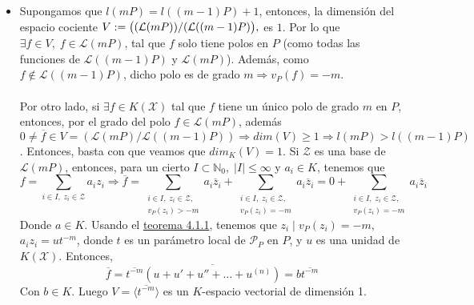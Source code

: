 \documentclass[11pt,spanish]{book}
\newcommand{\X}{\mathbf{\mathcal{X}}}
\begin{document}
\begin{itemize}
    \item Supongamos que $l(mP)=l((m-1)P)+1$, entonces, la dimensión del espacio cociente $V:=\big{(}(\mathcal{L}(mP))/(\mathcal{L}((m-1)P)\big{)},$
    es $1$. Por lo que $\exists f\in V,\; f\in \mathcal{L}(mP)$, tal que $f$ solo tiene polos en $P$ (como todas las funciones de $\mathcal{L}((m-1)P)$ y $\mathcal{L}(mP)$). Además, como $f\notin \mathcal{L}((m-1)P)$, dicho polo es de grado $m\Rightarrow v_P(f)=-m$.\\
    \\Por otro lado, si $\exists f\in K(\mathbf{\mathcal{X}})$ tal que $f$ tiene un único polo de grado $m$ en $P$, entonces, por el grado del polo $f\in\mathcal{L}(mP)$, además $0\neq \overline{f}\in V=(\mathcal{L}(mP)/\mathcal{L}((m-1)P))\Rightarrow dim(V)\geq 1 \Rightarrow l(mP)>l((m-1)P)$. Entonces, basta con que veamos que $dim_{K}(V)=1$. Si $\mathcal{Z}$ es una base de $\mathcal{L}(mP)$, entonces, para un cierto $I\subset \mathbb{N}_0,\; |I|\leq \infty$ y $a_{i}\in K$, tenemos que
    $$f=\sum_{i\in I,\;z_{i}\in\mathcal{Z}}a_i z_{i}\Rightarrow \overline{f}=\sum_{\substack{i\in I,\;z_{i}\in\mathcal{Z},\\ v_{P}(z_i)>-m}}a_i \overline{z}_{i}+\sum_{\substack{i\in I,\;z_{i}\in\mathcal{Z},\\ v_{P}(z_i)=-m}}a_i \overline{z}_{i}=0+\sum_{\substack{i\in I,\;z_{i}\in\mathcal{Z},\\ v_{P}(z_i)=-m}}a_i \overline{z}_{i}$$
    Donde $a\in K$. Usando el \hyperlink{4.1.1}{teorema 4.1.1}, tenemos que $z_i\;|\; v_P(z_i)=-m$, $a_iz_i=ut^{-m}$, donde $t$ es un parámetro local de $\mathcal{P}_P$ en $P$, y $u$ es una unidad de $K(\X)$. Entonces,
    $$\overline{f}=\overline{t^{-m}}\overline{(u+u'+u''+\ldots+u^{(n)})}=b\overline{t^{-m}}$$
    Con $b\in K$. Luego $V=\langle \overline{t^{-m}}\rangle $ es un $K$-espacio vectorial de dimensión 1. 
    
    

\end{itemize}
\end{document}
